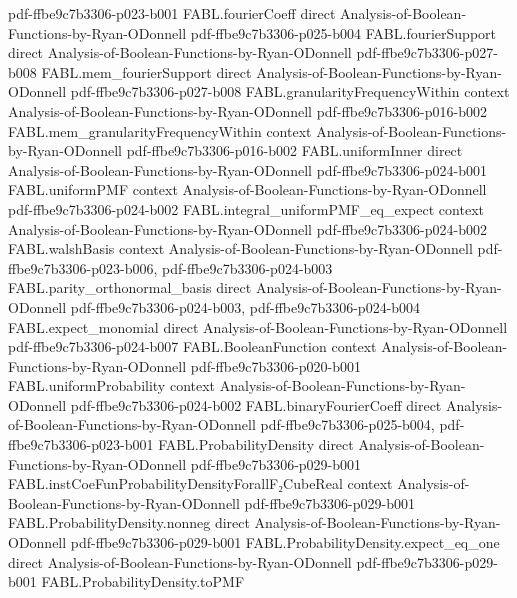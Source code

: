 \begin{theorem}
  {pdf-ffbe9c7b3306-p023-b001}
\proofstep
  {FABL.fourierCoeff}
  {direct}
  {Analysis-of-Boolean-Functions-by-Ryan-ODonnell}
  {pdf-ffbe9c7b3306-p025-b004}
\proofstep
  {FABL.fourierSupport}
  {direct}
  {Analysis-of-Boolean-Functions-by-Ryan-ODonnell}
  {pdf-ffbe9c7b3306-p027-b008}
\proofstep
  {FABL.mem_fourierSupport}
  {direct}
  {Analysis-of-Boolean-Functions-by-Ryan-ODonnell}
  {pdf-ffbe9c7b3306-p027-b008}
\proofstep
  {FABL.granularityFrequencyWithin}
  {context}
  {Analysis-of-Boolean-Functions-by-Ryan-ODonnell}
  {pdf-ffbe9c7b3306-p016-b002}
\proofstep
  {FABL.mem_granularityFrequencyWithin}
  {context}
  {Analysis-of-Boolean-Functions-by-Ryan-ODonnell}
  {pdf-ffbe9c7b3306-p016-b002}
\proofstep
  {FABL.uniformInner}
  {direct}
  {Analysis-of-Boolean-Functions-by-Ryan-ODonnell}
  {pdf-ffbe9c7b3306-p024-b001}
\proofstep
  {FABL.uniformPMF}
  {context}
  {Analysis-of-Boolean-Functions-by-Ryan-ODonnell}
  {pdf-ffbe9c7b3306-p024-b002}
\proofstep
  {FABL.integral_uniformPMF_eq_expect}
  {context}
  {Analysis-of-Boolean-Functions-by-Ryan-ODonnell}
  {pdf-ffbe9c7b3306-p024-b002}
\proofstep
  {FABL.walshBasis}
  {context}
  {Analysis-of-Boolean-Functions-by-Ryan-ODonnell}
  {pdf-ffbe9c7b3306-p023-b006,
    pdf-ffbe9c7b3306-p024-b003}
\proofstep
  {FABL.parity_orthonormal_basis}
  {direct}
  {Analysis-of-Boolean-Functions-by-Ryan-ODonnell}
  {pdf-ffbe9c7b3306-p024-b003,
    pdf-ffbe9c7b3306-p024-b004}
\proofstep
  {FABL.expect_monomial}
  {direct}
  {Analysis-of-Boolean-Functions-by-Ryan-ODonnell}
  {pdf-ffbe9c7b3306-p024-b007}
\proofstep
  {FABL.BooleanFunction}
  {context}
  {Analysis-of-Boolean-Functions-by-Ryan-ODonnell}
  {pdf-ffbe9c7b3306-p020-b001}
\proofstep
  {FABL.uniformProbability}
  {context}
  {Analysis-of-Boolean-Functions-by-Ryan-ODonnell}
  {pdf-ffbe9c7b3306-p024-b002}
\proofstep
  {FABL.binaryFourierCoeff}
  {direct}
  {Analysis-of-Boolean-Functions-by-Ryan-ODonnell}
  {pdf-ffbe9c7b3306-p025-b004,
    pdf-ffbe9c7b3306-p023-b001}
\proofstep
  {FABL.ProbabilityDensity}
  {direct}
  {Analysis-of-Boolean-Functions-by-Ryan-ODonnell}
  {pdf-ffbe9c7b3306-p029-b001}
\proofstep
  {FABL.instCoeFunProbabilityDensityForallF₂CubeReal}
  {context}
  {Analysis-of-Boolean-Functions-by-Ryan-ODonnell}
  {pdf-ffbe9c7b3306-p029-b001}
\proofstep
  {FABL.ProbabilityDensity.nonneg}
  {direct}
  {Analysis-of-Boolean-Functions-by-Ryan-ODonnell}
  {pdf-ffbe9c7b3306-p029-b001}
\proofstep
  {FABL.ProbabilityDensity.expect_eq_one}
  {direct}
  {Analysis-of-Boolean-Functions-by-Ryan-ODonnell}
  {pdf-ffbe9c7b3306-p029-b001}
\proofstep
  {FABL.ProbabilityDensity.toPMF}

\end{theorem}
